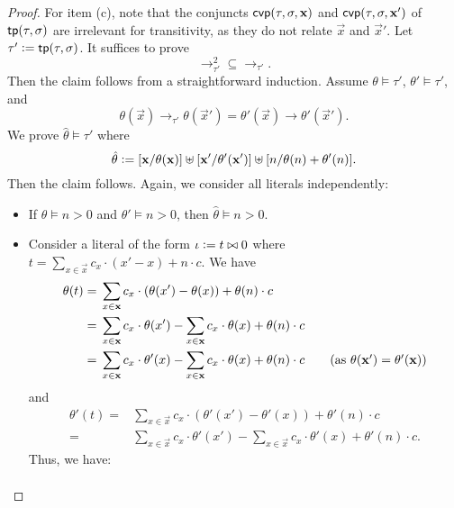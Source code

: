 {\begin{proof}
    For item (c), note that the conjuncts $\mathsf{cvp}(\tau,\sigma,\bm{\mathrm{x}})$ and $\mathsf{cvp}(\tau,\sigma,\bm{\mathrm{x}}')$ of $\mathsf{tp}(\tau,\sigma)$ are irrelevant for transitivity, as they do not relate $\vec{x}$ and $\vec{x}'$.
    Let $\tau' \mathrel{\mathop:}= \mathsf{tp}(\tau,\sigma)$.
    It suffices to prove
    \[
      {\to^2_{\tau'}} \subseteq {\to_{\tau'}}.
    \]
    Then the claim follows from a straightforward induction.
    Assume $\theta \models \tau'$, $\theta' \models \tau'$, and
    \[
      \theta(\vec{x}) \to_{\tau'} \theta(\vec{x}') = \theta'(\vec{x}) \to \theta'(\vec{x}').
    \]
    We prove $\hat{\theta} \models \tau'$ where
    \[
      \hat{\theta} \mathrel{\mathop:}= [\bm{\mathrm{x}} / \theta(\bm{\mathrm{x}})] \uplus [\bm{\mathrm{x}}' / \theta'(\bm{\mathrm{x}}')] \uplus [n / \theta(n) + \theta'(n)].
    \]
    Then the claim follows.
    Again, we consider all literals independently:
    \begin{itemize}
      \item If $\theta \models n > 0$ and $\theta' \models n > 0$, then $\hat{\theta} \models n > 0$.
      \item Consider a literal of the form $\iota \mathrel{\mathop:}= t \bowtie 0$ where $t = \sum_{x \in \vec{x}} c_x \cdot (x'-x) + n \cdot c$.
            We have
            \begin{align*}
              \theta(t) = {} & \sum_{x \in \vec{x}} c_x \cdot (\theta(x')-\theta(x)) + \theta(n) \cdot c                                                                               \\
              {} = {}        & \sum_{x \in \vec{x}} c_x \cdot \theta(x') - \sum_{x \in \vec{x}} c_x \cdot \theta(x) + \theta(n) \cdot c                                                \\
              {} = {}        & \sum_{x \in \vec{x}} c_x \cdot \theta'(x) - \sum_{x \in \vec{x}} c_x \cdot \theta(x) + \theta(n) \cdot c \tag{as $\theta(\vec{x}') = \theta'(\vec{x})$}
            \end{align*}
            and
            \begin{align*}
              \theta'(t) = {} & \sum_{x \in \vec{x}} c_x \cdot (\theta'(x')-\theta'(x)) + \theta'(n) \cdot c                                 \\
              {} = {}         & \sum_{x \in \vec{x}} c_x \cdot \theta'(x') - \sum_{x \in \vec{x}} c_x \cdot \theta'(x) + \theta'(n) \cdot c.
            \end{align*}
            Thus, we have:
            \begin{align*}

\end{align*}
\end{itemize}
\end{proof}}
